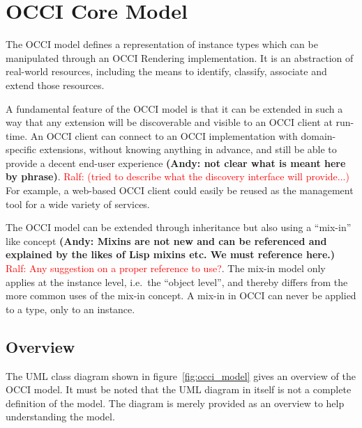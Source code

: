 \documentclass[10pt,a4paper]{article}
\newcommand{\ralf}[1]{\textcolor{red}{Ralf: #1}}
\begin{document}
\section{OCCI Core Model}
The OCCI model defines a representation of instance types which can be
manipulated through an OCCI Rendering implementation. 
It is an abstraction of real-world 
resources, including the means to identify, classify, associate 
and extend those resources. 

A fundamental feature of the OCCI model is that it can be extended in such a
way that any extension will be discoverable and visible to an OCCI client at
run-time. An OCCI client can connect to an OCCI implementation with
domain-specific extensions, without knowing anything in advance, and still be
able to provide a decent end-user experience \textbf{(Andy: not clear what is meant here by phrase)}. 
\ralf{(tried to describe what the discovery interface will provide...)}
For example, a web-based OCCI
client could easily be reused as the management tool for a wide variety of
services.

The OCCI model can be extended through inheritance but also
using a ``mix-in'' like concept \textbf{(Andy: Mixins are not new and can be referenced and explained
by the likes of Lisp mixins etc. We must reference here.)}
\ralf{Any suggestion on a proper reference to use?}.
The mix-in model only applies at the instance
level, i.e.~the ``object level'', and thereby differs from the more common uses
of the mix-in concept. A mix-in in OCCI can never be applied to a type, only to
an instance.

\subsection{Overview}

The UML class diagram shown in figure~\ref{fig:occi_model} gives an overview of
the OCCI model. It must be noted that the UML diagram in itself is not a
complete definition of the model. The diagram is merely provided as an overview
to help understanding the model. 
\end{document}
